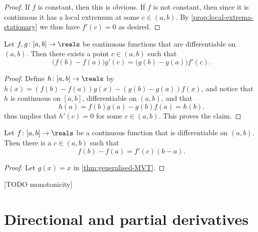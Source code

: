 \documentclass[article, a4paper, 11pt, oneside]{memoir}
\numberwithin{equation}{chapter}
\begin{document}
\begin{proof}
    If $f$ is constant, then this is obvious. If $f$ is not constant, then since it is continuous it has a local extremum at some $c \in (a,b)$. By \cref{prop:local-extrema-stationary} we thus have $f'(c) = 0$ as desired.
\end{proof}


\begin{theorem}
    \label{thm:generalised-MVT}
    Let $f,g \colon [a,b] \to \reals$ be continuous functions that are differentiable on $(a,b)$. Then there exists a point $c \in (a,b)$ such that
    \begin{equation*}
        \bigl( f(b) - f(a) \bigr) g'(c)
            = \bigl( g(b) - g(a) \bigr) f'(c).
    \end{equation*}
\end{theorem}

\begin{proof}
    Define $h \colon [a,b] \to \reals$ by $h(x) = (f(b) - f(a)) g(x) - (g(b) - g(a)) f(x)$, and notice that $h$ is continuous on $[a,b]$, differentiable on $(a,b)$, and that
    \begin{equation*}
        h(a)
            = f(b)g(a) - g(b)f(a)
            = h(b).
    \end{equation*}
     thus implies that $h'(c) = 0$ for some $c \in (a,b)$. This proves the claim.
\end{proof}


\begin{corollary}
    Let $f \colon [a,b] \to \reals$ be a continuous function that is differentiable on $(a,b)$. Then there is a $c \in (a,b)$ such that
    \begin{equation*}
        f(b) - f(a)
            = f'(c) (b-a).
    \end{equation*}
\end{corollary}

\begin{proof}
    Let $g(x) = x$ in \cref{thm:generalised-MVT}.
\end{proof}

[TODO monotonicity]


\section{Directional and partial derivatives}
\end{document}
